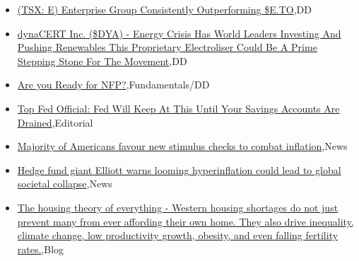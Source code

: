 \documentclass{article}%
\begin{document}
%
\begin{itemize}%
\item%
\href{https://reddit.com/r/Baystreetbets/comments/yl6ywl/tsx\_e\_enterprise\_group\_consistently\_outperforming/}{(TSX: E) Enterprise Group Consistently Outperforming \$E.TO},DD%
\item%
\href{https://reddit.com/r/Baystreetbets/comments/yl6v22/dynacert\_inc\_dya\_energy\_crisis\_has\_world\_leaders/}{dynaCERT Inc. (\$DYA) - Energy Crisis Has World Leaders Investing And Pushing Renewables This Proprietary Electroliser Could Be A Prime Stepping Stone For The Movement},DD%
\item%
\href{https://reddit.com/r/StockMarket/comments/ylu1wj/are\_you\_ready\_for\_nfp/}{Are you Ready for NFP?},Fundamentals/DD%
\item%
\href{https://reddit.com/r/Economics/comments/ylxmd7/top\_fed\_official\_fed\_will\_keep\_at\_this\_until\_your/}{Top Fed Official: Fed Will Keep At This Until Your Savings Accounts Are Drained},Editorial%
\item%
\href{https://reddit.com/r/Economics/comments/ylubsy/majority\_of\_americans\_favour\_new\_stimulus\_checks/}{Majority of Americans favour new stimulus checks to combat inflation},News%
\item%
\href{https://reddit.com/r/Economics/comments/ylo627/hedge\_fund\_giant\_elliott\_warns\_looming/}{Hedge fund giant Elliott warns looming hyperinflation could lead to global societal collapse},News%
\item%
\href{https://reddit.com/r/Economics/comments/yln8yh/the\_housing\_theory\_of\_everything\_western\_housing/}{The housing theory of everything - Western housing shortages do not just prevent many from ever affording their own home. They also drive inequality, climate change, low productivity growth, obesity, and even falling fertility rates.},Blog%
\end{itemize}%
\end{document}

